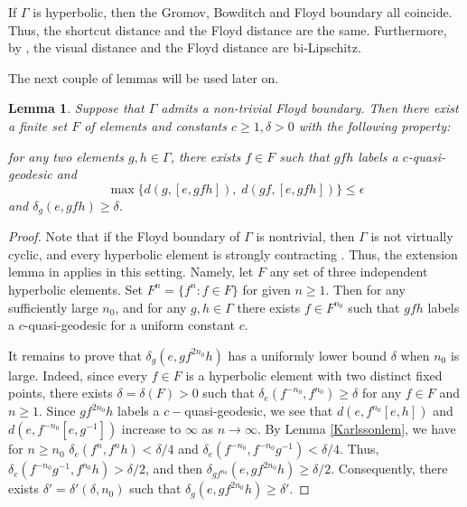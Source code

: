 \documentclass{amsart}
\newtheorem{lem}[thm]{Lemma}
\theoremstyle{definition}
\theoremstyle{remark}
\begin{document}
If $\Gamma$ is hyperbolic, then the Gromov, Bowditch and Floyd boundary all coincide.
Thus, the shortcut distance and the Floyd distance are the same.
Furthermore, by \cite[Proposition~6.1]{PY}, the visual distance and the Floyd distance are bi-Lipschitz.

The next couple of lemmas will be used later on.





\begin{lem}\label{ExtensionLem}
Suppose that $\Gamma$ admits a non-trivial Floyd boundary. Then there exist a finite set $F$ of elements and constants $c\ge 1, \delta>0$ with the following property:

for any two elements $g, h\in \Gamma$, there exists $f\in F$ such that $gfh$ labels a $c$-quasi-geodesic and 
$$
\max\{d(g, [e, gfh]), \; d(gf, [e, gfh])\}\le \epsilon
$$
and $\delta_g(e, gfh)\ge \delta$.
\end{lem}
\begin{proof}
Note that if the Floyd boundary of $\Gamma$ is nontrivial, then $\Gamma$ is not virtually cyclic, and every hyperbolic element is strongly contracting \cite{Yanggrowthtightness}.
Thus, the extension lemma in \cite{YangSCC} applies in this setting.
Namely, let $F$ any set of three independent hyperbolic elements. Set $F^n=\{f^n: f\in F\}$ for given $n\ge 1$. Then for any sufficiently large $n_0$, and for any $g,h\in \Gamma$ there exists $f\in F^{n_0}$ such that $gfh$ labels a $c$-quasi-geodesic for a uniform constant $c$. 

It remains to prove that $\delta_g(e, gf^{2n_0}h)$ has a uniformly lower bound $\delta$ when $n_0$ is large.   Indeed, since  every $ f\in F$ is a hyperbolic element with two distinct fixed points, there exists $\delta=\delta(F)>0$ such that $\delta_e(f^{-n_0}, f^{n_0})\ge \delta$ for any $f\in F$ and $n\ge 1$.
Since $gf^{2n_0}h$ labels a $c-$quasi-geodesic, we see that $d(e, f^{n_0}[e,h])$ and $d(e, f^{-n_0}[e,g^{-1}])$  increase to $\infty$  as $n\to\infty$.
By Lemma \ref{Karlssonlem}, we have  for $n\ge n_0$ $\delta_e(f^n,f^nh)<\delta/4$  and $\delta_e(f^{-n_0},f^{-n_0}g^{-1})<\delta/4$.
Thus, $\delta_e(f^{-n_0}g^{-1}, f^{n_0}h)>\delta/2$, and then $\delta_{gf^{n_0}}(e, gf^{2n_0}h)\ge \delta/2$. Consequently, there exists $\delta'=\delta'(\delta, n_0)$ such that $\delta_{g}(e, gf^{2n_0}h)\ge \delta'$.
\end{proof}
\end{document}
